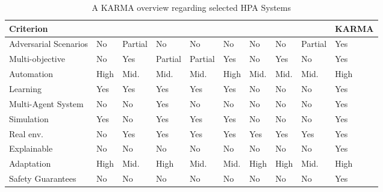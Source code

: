 \documentclass[conference]{IEEEtran}
\begin{document}
\begin{table}[h!]
    \centering
    \caption{A KARMA overview regarding selected HPA Systems}
    \label{tab:autoscaling_criteria}
    {\scriptsize
    \renewcommand{\arraystretch}{1.1}
    \begin{tabular}{>{\raggedright\arraybackslash}m{1.22cm}>{\centering\arraybackslash}m{0.34cm}>{\centering\arraybackslash}m{0.34cm}>{\centering\arraybackslash}m{0.34cm}>{\centering\arraybackslash}m{0.34cm}>{\centering\arraybackslash}m{0.34cm}>{\centering\arraybackslash}m{0.34cm}>{\centering\arraybackslash}m{0.34cm}>{\centering\arraybackslash}m{0.34cm}>{\centering\arraybackslash}m{0.75cm}}
    \hline
    \textbf{Criterion} & \vspace{-0.3cm}\textbf{\cite{GymHPA}} & \vspace{-0.3cm}\textbf{\cite{AWARE}} & \vspace{-0.3cm}\textbf{\cite{IMAM}} & \vspace{-0.3cm}\textbf{\cite{Libra}} & \vspace{-0.3cm}\textbf{\cite{QoSRL}} & \vspace{-0.3cm}\textbf{\cite{AHPA}} & \vspace{-0.3cm}\textbf{\cite{KOSMOS}} & \vspace{-0.3cm}\textbf{\cite{COPA}} & \textbf{KARMA} \\
    \hline
    \hline
    Adversarial Scenarios & No & Partial & No & No & No & No & No & Partial & Yes \\
    \hline
    Multi-objective & No & Yes & Partial & Partial & Yes & No & Yes & No & Yes \\
    \hline
    Automation & High & Mid. & Mid. & Mid. & High & Mid. & Mid. & Mid. & High \\
    \hline
    Learning & Yes & Yes & Yes & Yes & Yes & No & No & No & Yes \\
    \hline
    Multi-Agent System & No & No & Yes & No & No & No & No & No & Yes \\
    \hline
    Simulation & Yes & No & Yes & Yes & Yes & No & No & No & Yes \\
    \hline
    Real env. & No & Yes & Yes & Yes & Yes & Yes & Yes & Yes & Yes \\
    \hline
    Explainable & No & No & No & No & No & No & No & No & Yes \\
    \hline
    Adaptation & High & Mid. & High & Mid. & Mid. & High & High & Mid. & High \\
    \hline
    Safety Guarantees & No & No & No & No & No & No & No & No & Yes \\
    \hline
    \end{tabular}%
    }
  \end{table}
\end{document}
